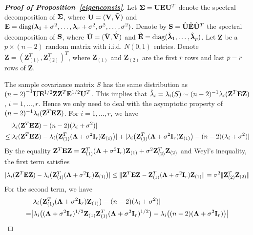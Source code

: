 \documentclass[review]{elsarticle}
\DeclareMathOperator{\mydiag}{diag}
\newcommand{\bZ}{\mathbf{Z}}
\newcommand{\bfsym}[1]{\ensuremath{\boldsymbol{#1}}}
\def\blambda {\bfsym {\lambda}}        \def\bLambda {\bfsym {\Lambda}}
\theoremstyle{plain}
\theoremstyle{definition}
\theoremstyle{remark}
\begin{document}
\begin{proof}[\textbf{Proof of Proposition~\ref{eigenconsis}}]
    Let $\bSigma=\BU\BE\BU^T$ denote the spectral decomposition of $\bSigma$, where
     $\mathbf{U}=(\mathbf{V},\tilde{\mathbf{V}})$ and $\BE=\mydiag(\blambda_1+\sigma^2,\ldots,\blambda_r+\sigma^2,\sigma^2,\ldots,\sigma^2)$.
Denote by $\mathbf{S}=\hat{\mathbf{U}}\hat{\mathbf{E}}\hat{\mathbf{U}}^T$ the spectral decomposition of $\mathbf{S}$, where $\hat{\mathbf{U}}=(\hat{\mathbf{V}},\hat{\tilde{\mathbf{V}}})$ and $\hat{\BE}=\mydiag(\hat{\blambda}_1,\ldots,\hat{\blambda}_p)$.
Let $\bZ$ be a $p\times (n-2)$ random matrix with i.i.d. $N(0,1)$ entries.
Denote $\bZ={(\bZ_{(1)}^T,\bZ_{(2)}^T)}^T$, where $\bZ_{(1)}$ and $\bZ_{(2)}$ are the first $r$ rows and last $p-r$ rows of $\bZ$. 

    {\color{red}
The sample covariance matrix $S$ has the same distribution as
$
    {(n-2)}^{-1} \BU \BE^{1/2} \bZ \bZ^T \BE^{1/2} \BU^T
$.
This implies that $\hat{\lambda}_i=\lambda_i(S)\sim (n-2)^{-1}\lambda_i(\bZ^T \BE \bZ)$, $i=1,\ldots,r$.
Hence we only need to deal with the asymptotic property of $(n-2)^{-1}\lambda_i(\bZ^T \BE \bZ)$.
For $i=1,\ldots,r$, we have
    \begin{equation*}
        \begin{aligned}
            &|\lambda_i(\bZ^T \BE \bZ)-(n-2)(\lambda_i +\sigma^2)|\\
            \leq&
            |\lambda_i(\bZ^T \BE \bZ)-\lambda_i \big(\bZ_{(1)}^T(\bLambda+\sigma^2 \BI_r)\bZ_{(1)}\big)|
            +
|\lambda_i \big(\bZ_{(1)}^T(\bLambda+\sigma^2 \BI_r)\bZ_{(1)}\big)
        -(n-2)(\lambda_i +\sigma^2)|\\
        \end{aligned}
    \end{equation*}
    By the equality
$
    \bZ^T \BE \bZ= \bZ_{(1)}^T (\bLambda +\sigma^2 \BI_r) \bZ_{(1)}+
\sigma^2 \bZ_{(2)}^T  \bZ_{(2)}
$
and Weyl's inequality, the first term satisfies
$$
            |\lambda_i(\bZ^T \BE \bZ)-\lambda_i \big(\bZ_{(1)}^T(\bLambda+\sigma^2 \BI_r)\bZ_{(1)}\big)|
            \leq \|\bZ^T \BE \bZ-\bZ_{(1)}^T(\bLambda+\sigma^2 \BI_r)\bZ_{(1)}\|
            =\sigma^2\|\bZ_{(2)}^T  \bZ_{(2)}\|
    $$
For the second term, we have
$$
    \begin{aligned}
        &|\lambda_i \big(\bZ_{(1)}^T(\bLambda+\sigma^2 \BI_r)\bZ_{(1)}\big)-(n-2)(\lambda_i +\sigma^2)|\\
        =&
    \big|\lambda_i \big((\bLambda+\sigma^2 \BI_r)^{1/2}\bZ_{(1)}\bZ_{(1)}^T(\bLambda+\sigma^2 \BI_r)^{1/2}\big)
        -\lambda_i\big((n-2)(\bLambda+\sigma^2 \BI_r)\big)\big|\\

\end{aligned}$$}
\end{proof}
\end{document}
